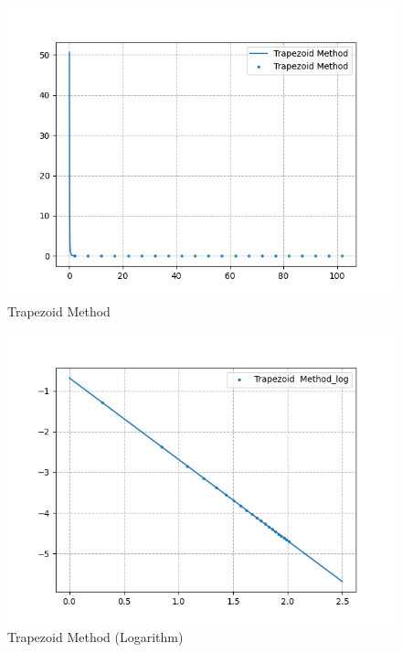 \documentclass[12pt]{article}
\begin{document}
\begin{figure}[H]
    \centering
    \includegraphics[width=13cm]{trap.png}
    \caption{Trapezoid Method}
\end{figure}

\begin{figure}[H]
    \centering
    \includegraphics[width=13cm]{traplog.png}
    \caption{Trapezoid Method (Logarithm)}
\end{figure}

\newpage
\appendix
{}
\end{document}
